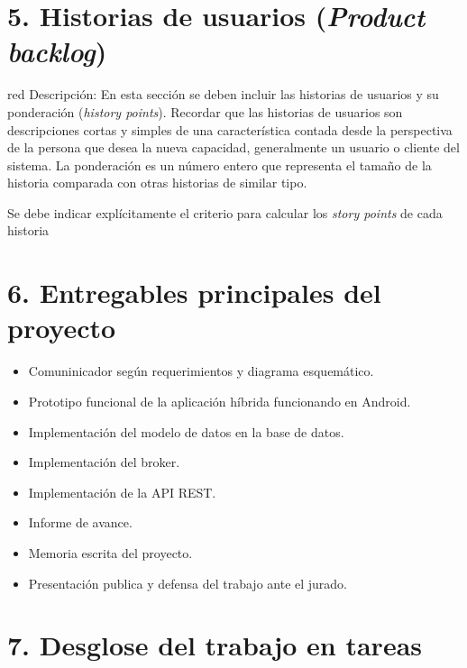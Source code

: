 \documentclass[
11pt, %
codirector, %
]{charter}
\begin{document}

\section{5. Historias de usuarios (\textit{Product backlog})}
\label{sec:backlog}

\begin{consigna}{red}
Descripción: En esta sección se deben incluir las historias de usuarios y su ponderación (\textit{history points}). Recordar que las historias de usuarios son descripciones cortas y simples de una característica contada desde la perspectiva de la persona que desea la nueva capacidad, generalmente un usuario o cliente del sistema. La ponderación es un número entero que representa el tamaño de la historia comparada con otras historias de similar tipo.

Se debe indicar explícitamente el criterio para calcular los \textit{story points} de cada historia
\end{consigna}

\section{6. Entregables principales del proyecto}
\label{sec:entregables}


\begin{itemize}
	\item Comuninicador según requerimientos y diagrama esquemático.
	\item Prototipo funcional de la aplicación híbrida funcionando en Android.
	\item Implementación del modelo de datos en la base de datos.
	\item Implementación del broker.
	\item Implementación de la API REST.
	\item Informe de avance.
	\item Memoria escrita del proyecto.
	\item Presentación publica y defensa del trabajo ante el jurado.
\end{itemize}


\section{7. Desglose del trabajo en tareas}
\label{sec:wbs}
\end{document}
